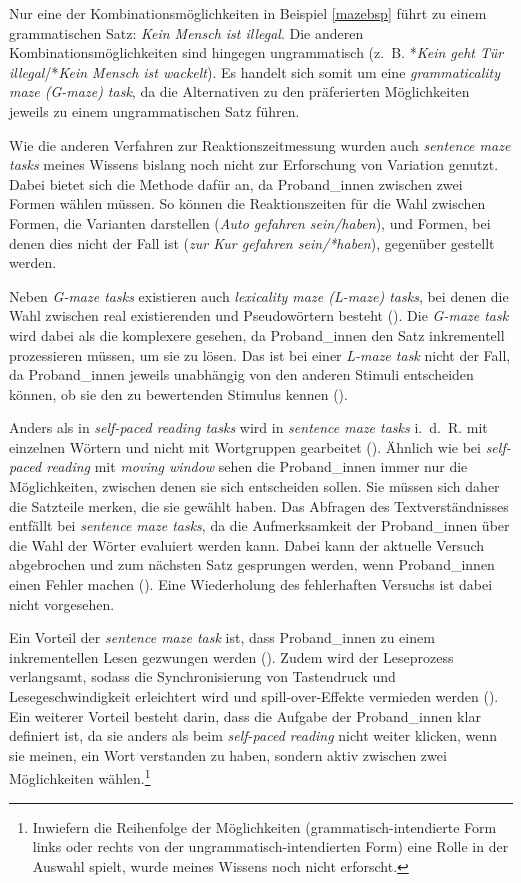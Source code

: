 Nur eine der Kombinationsmöglichkeiten in Beispiel \ref{mazebsp} führt zu einem grammatischen Satz: \textit{Kein Mensch ist illegal}. Die anderen Kombinationsmöglichkeiten sind hingegen ungrammatisch (z.~B. *\textit{Kein geht Tür illegal}/*\textit{Kein Mensch ist wackelt}). Es handelt sich somit um eine \textit{grammaticality maze (G-maze) task}, da die Alternativen zu den präferierten Möglichkeiten jeweils zu einem ungrammatischen Satz führen. 


Wie die anderen Verfahren zur Reaktionszeitmessung wurden auch \textit{sentence maze tasks} meines Wissens bislang noch nicht zur Erforschung von Variation genutzt. Dabei bietet sich die Methode dafür an, da Proband\_innen zwischen zwei Formen wählen müssen. So können die Reaktionszeiten für die Wahl zwischen Formen, die Varianten darstellen (\textit{Auto gefahren sein/haben}), und Formen, bei denen dies nicht der Fall ist (\textit{zur Kur gefahren sein/*haben}), gegenüber gestellt werden.

Neben \textit{G-maze tasks} existieren auch \textit{lexicality maze (L-maze) tasks}, bei denen die Wahl zwischen real existierenden und Pseudowörtern besteht (\cite[108]{Witzel.2012}). Die \textit{G-maze task} wird dabei als die komplexere gesehen, da Pro\-\mbox{band\_in}\-nen den Satz inkrementell prozessieren müssen, um sie zu lösen. Das ist bei einer \textit{L-maze task} nicht der Fall, da Proband\_innen jeweils unabhängig von den anderen Stimuli entscheiden können, ob sie den zu bewertenden Stimulus kennen (\cite[109]{Witzel.2012}). 



Anders als in \textit{self-paced reading tasks} wird in \textit{sentence maze tasks} i.~d.~R. mit einzelnen Wörtern und nicht mit Wortgruppen gearbeitet (\cite[163]{Forster.2009}). Ähnlich wie bei \textit{self-paced reading} mit \textit{moving window} sehen die Proband\_innen immer nur die Möglichkeiten, zwischen denen sie sich entscheiden sollen. Sie müssen sich daher die Satzteile merken, die sie gewählt haben. Das Abfragen des Textverständnisses entfällt bei \textit{sentence maze tasks}, da die Aufmerksamkeit der Proband\_innen über die Wahl der Wörter evaluiert werden kann. Dabei kann der aktuelle Versuch abgebrochen und zum nächsten Satz gesprungen werden, wenn Proband\_innen einen Fehler machen (\cite[163]{Forster.2009}). Eine Wiederholung des fehlerhaften Versuchs ist dabei nicht vorgesehen.  

Ein Vorteil der \textit{sentence maze task} ist, dass Proband\_innen zu einem inkrementellen Lesen gezwungen werden (\cite[164]{Forster.2009}). Zudem wird der Leseprozess verlangsamt, sodass die Synchronisierung von Tastendruck und Lesegeschwindigkeit erleichtert wird und spill-over-Effekte vermieden werden (\cite[164]{Forster.2009}). Ein weiterer Vorteil besteht darin, dass die Aufgabe der Pro\-\mbox{band\_in}\-nen klar definiert ist, da sie anders als beim \textit{self-paced reading} nicht weiter klicken, wenn sie meinen, ein Wort verstanden zu haben, sondern aktiv zwischen zwei Möglichkeiten wählen.\footnote{Inwiefern die Reihenfolge der Möglichkeiten (grammatisch-intendierte Form links oder rechts von der ungrammatisch-intendierten Form) eine Rolle in der Auswahl spielt, wurde meines Wissens noch nicht erforscht.}  


